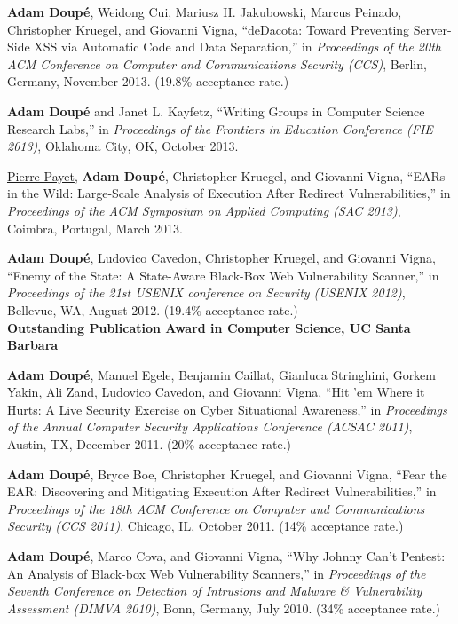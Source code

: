 \documentclass[11pt,letterpaper,sans]{moderncv}
\begin{document}
\begin{etaremune}
\item \textbf{Adam Doup\'e}, Weidong Cui, Mariusz H. Jakubowski,
  Marcus Peinado, Christopher Kruegel, and Giovanni Vigna, ``deDacota:
  Toward Preventing Server-Side XSS via Automatic Code and Data
  Separation,'' in \emph{Proceedings of the 20th ACM Conference on
    Computer and Communications Security (CCS)}, Berlin, Germany,
  November 2013. (19.8\% acceptance rate.)

\item \textbf{Adam Doup\'e} and Janet L. Kayfetz, ``Writing Groups in
  Computer Science Research Labs,'' in \emph{Proceedings of the
    Frontiers in Education Conference (FIE 2013)}, Oklahoma City, OK,
  October 2013.

\item \underline{Pierre Payet}, \textbf{Adam Doup\'e}, Christopher
  Kruegel, and Giovanni Vigna, ``EARs in the Wild: Large-Scale
  Analysis of Execution After Redirect Vulnerabilities,'' in
  \emph{Proceedings of the ACM Symposium on Applied Computing (SAC
    2013)}, Coimbra, Portugal, March 2013.

\item \textbf{Adam Doup\'e}, Ludovico Cavedon, Christopher Kruegel,
  and Giovanni Vigna, ``Enemy of the State: A State-Aware Black-Box
  Web Vulnerability Scanner,'' in \emph{Proceedings of the 21st USENIX
    conference on Security (USENIX 2012)}, Bellevue, WA, August 2012.
  (19.4\% acceptance rate.) \\
  \textbf{Outstanding Publication Award in Computer
  Science, UC Santa Barbara}

\item \textbf{Adam Doup\'e}, Manuel Egele, Benjamin Caillat, Gianluca
  Stringhini, Gorkem Yakin, Ali Zand, Ludovico Cavedon, and Giovanni
  Vigna, ``Hit 'em Where it Hurts: A Live Security Exercise on Cyber
  Situational Awareness,'' in \emph{Proceedings of the Annual Computer
    Security Applications Conference (ACSAC 2011)}, Austin, TX,
  December 2011. (20\% acceptance rate.)

\item \textbf{Adam Doup\'e}, Bryce Boe, Christopher Kruegel, and
  Giovanni Vigna, ``Fear the EAR: Discovering and Mitigating Execution
  After Redirect Vulnerabilities,'' in \emph{Proceedings of the 18th
    ACM Conference on Computer and Communications Security (CCS
    2011)}, Chicago, IL, October 2011. (14\% acceptance rate.)

\item \textbf{Adam Doup\'e}, Marco Cova, and Giovanni Vigna, ``Why
  Johnny Can't Pentest: An Analysis of Black-box Web Vulnerability
  Scanners,'' in \emph{Proceedings of the Seventh Conference on
    Detection of Intrusions and Malware \& Vulnerability Assessment
    (DIMVA 2010)}, Bonn, Germany, July 2010. (34\% acceptance rate.)

\end{etaremune}
\end{document}

